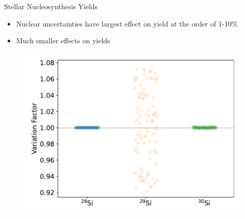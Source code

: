 \documentclass[10pt]{beamer}
\begin{document}
\begin{frame}{Stellar Nucleosynthesis Yields}
    \begin{minipage}{5cm}
        \begin{itemize}
            \setlength\itemsep{2em}
            \item Nuclear uncertainties have largest effect on  yield at the order of 1-10\%
            \item Much smaller effects on  yields 
        \end{itemize}
    \end{minipage}
    \begin{minipage}{6.5cm}
    \centering
        \begin{figure}
            \centering
            \includegraphics[width = \textwidth]{figs/M20Z1E-2_mcyieldresult.pdf}
        \end{figure}
    \end{minipage}
\end{frame}
\end{document}
